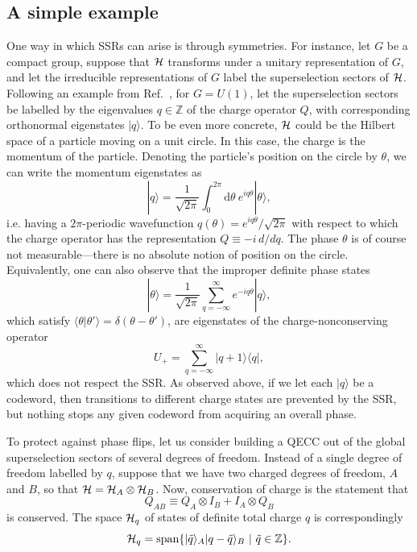 \documentclass[11pt,english]{article}
\newcommand{\bra}[1]{\langle #1|}
\newcommand{\ket}[1]{|#1\rangle}
\newcommand{\braket}[2]{\langle #1|#2\rangle}
\newcommand{\Hil}{{\cal H}}
\newcommand{\mrm}[1]{\mathrm{#1}}
\newcommand{\dee}{\mathrm{d}}
\begin{document}
\subsection{A simple example}
\label{sec:simple-example}


One way in which SSRs can arise is through symmetries.
For instance, let $G$ be a compact group, suppose that $\Hil$ transforms under a unitary representation of $G$, and let the irreducible representations of $G$ label the superselection sectors of $\Hil$.
Following an example from Ref.~\cite{Kitaev:2003zj}, for $G = U(1)$, let the superselection sectors be labelled by the eigenvalues $q \in \mathbb{Z}$ of the charge operator $Q$, with corresponding orthonormal eigenstates $\ket{q}$.
To be even more concrete, $\Hil$ could be the Hilbert space of a particle moving on a unit circle.
In this case, the charge is the momentum of the particle.
Denoting the particle's position on the circle by $\theta$, we can write the momentum eigenstates as
\begin{equation}
    \ket{q} = \frac{1}{\sqrt{2\pi}}\int_0^{2\pi} \dee\theta~e^{iq\theta} \ket{\theta},
\end{equation}
i.e. having a $2\pi$-periodic wavefunction $q(\theta) = e^{iq\theta}/\sqrt{2\pi}$ with respect to which the charge operator has the representation $Q \equiv -i \, d/dq$.
The phase $\theta$ is of course not measurable---there is no absolute notion of position on the circle.
Equivalently, one can also observe that the improper definite phase states
\begin{equation}
    \ket{\theta} = \frac{1}{\sqrt{2\pi}} \sum_{q=-\infty}^{\infty} e^{-iq\theta} \ket{q},
\end{equation}
which satisfy $\braket{\theta}{\theta'} = \delta(\theta-\theta')$, are eigenstates of the charge-nonconserving operator
\begin{equation}
    U_+ = \sum_{q=-\infty}^{\infty} \ket{q+1}\bra{q},
\end{equation}
which does not respect the SSR.
As observed above, if we let each $\ket{q}$ be a codeword, then transitions to different charge states are prevented by the SSR, but nothing stops any given codeword from acquiring an overall phase.

To protect against phase flips, let us consider building a QECC out of the global superselection sectors of several degrees of freedom.
Instead of a single degree of freedom labelled by $q$, suppose that we have two charged degrees of freedom, $A$ and $B$, so that $\Hil = \Hil_A \otimes \Hil_B$.
Now, conservation of charge is the statement that
\begin{equation}
Q_{AB} \equiv Q_A \otimes I_B + I_A \otimes Q_B
\end{equation}
is conserved.
The space $\Hil_q$ of states of definite total charge $q$ is correspondingly
\begin{equation}
\Hil_q = \mrm{span} \{ \ket{\tilde q}_A \ket{q-\tilde q}_B ~ | ~ \tilde q \in \mathbb{Z} \}.
\end{equation}
\end{document}
